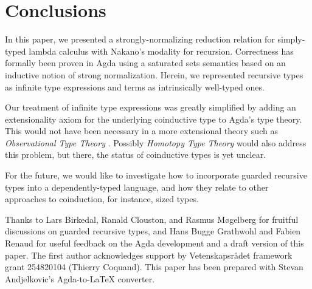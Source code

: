 
\section{Conclusions}
\label{sec:concl}

In this paper, we presented a strongly-normalizing reduction relation
for simply-typed lambda calculus with Nakano's modality for
recursion.  Correctness has formally been proven in Agda using a
saturated sets semantics based on an inductive notion of strong
normalization.  Herein, we represented recursive types as infinite
type expressions and terms as intrinsically well-typed ones.  

Our treatment of infinite type expressions was greatly simplified by
adding an extensionality axiom for the underlying coinductive type to
Agda's type theory.  This would not have been necessary in a more
extensional theory such as \emph{Observational Type Theory}
\citep{altenkirchMcBrideSwierstra:plpv07}.  Possibly \emph{Homotopy Type
Theory} \citep{hott} 
would also address this problem, but there, the status of
coinductive types is yet unclear.

For the future, we would like to investigate how to incorporate
guarded recursive types into a dependently-typed language, and how
they relate to other approaches to coinduction, for instance, sized
types.

Thanks to Lars Birkedal, Ranald Clouston, and Rasmus M\o{}gelberg for
fruitful discussions on guarded recursive types, and Hans Bugge
Grathwohl and Fabien Renaud for useful feedback on the Agda
development and a draft version of this paper.
The first author acknowledges support by Vetenskapsr\aa{}det framework
grant 254820104 (Thierry Coquand).  This paper has been prepared with
Stevan Andjelkovic's Agda-to-LaTeX converter. 


